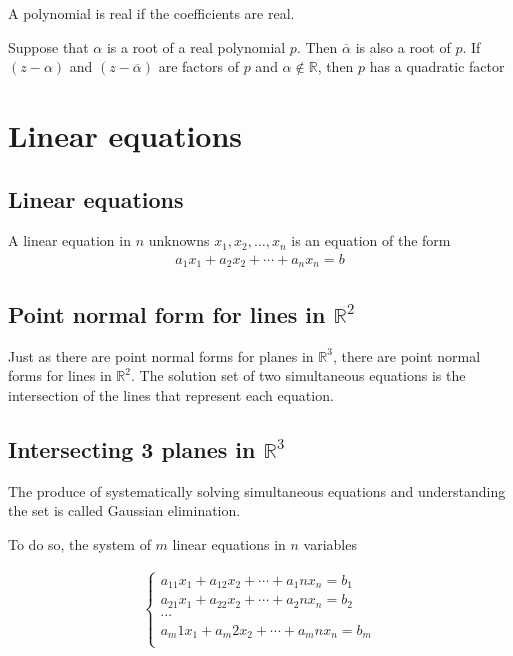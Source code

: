 \documentclass{report}
\begin{document}
		A polynomial is real if the coefficients are real.

		Suppose that $\alpha$ is a root of a real polynomial $p$. Then $\overline{\alpha}$ is also a root of $p$. If $(z-\alpha)$ and $(z-\overline{\alpha})$ are factors of $p$ and $\alpha \notin \mathbb{R}$, then $p$ has a quadratic factor

\chapter{Linear equations}

	\section{Linear equations}

		A linear equation in $n$ unknowns $x_1,x_2,\dots,x_n$ is an equation of the form
			\begin{align*}
				a_1x_1 + a_2x_2 + \cdots + a_nx_n = b
			\end{align*}

	\section{Point normal form for lines in $\mathbb{R}^2$}

		Just as there are point normal forms for planes in $\mathbb{R}^3$, there are point normal forms for lines in $\mathbb{R}^2$. The solution set of two simultaneous equations is the intersection of the lines that represent each equation.

	\section{Intersecting 3 planes in $\mathbb{R}^3$}
		
		The produce of systematically solving simultaneous equations and understanding the set is called Gaussian elimination.

		To do so, the system of $m$ linear equations in $n$ variables

		\begin{align*}
			\begin{cases}
				a_11x_1 + a_12x_2 + \cdots + a_1nx_n = b_1	\\
				a_21x_1 + a_22x_2 + \cdots + a_2nx_n = b_2	\\
				\cdots \\
				a_m1x_1 + a_m2x_2 + \cdots + a_mnx_n = b_m	\\
			\end{cases}
		\end{align*}
\end{document}
